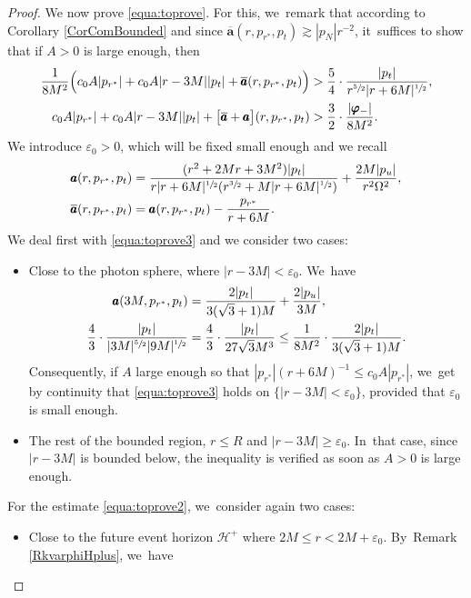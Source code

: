 \documentclass[10pt]{amsart}
\let\epsilon\varepsilon
\theoremstyle{plain}
\theoremstyle{definition}
\begin{document}
\begin{proof}
We now prove \eqref{equa:toprove}. For this, we~remark that according to Corollary \ref{CorComBounded} and since $\overline{\pmb{a}}(r,p_{r^*},p_t) \gtrsim |p_N|r^{-2}$, it~suffices to show that if $A>0$ is large enough, then
\begin{align}
\label{equa:toprove3}
\frac{1}{8M^2}\Bigl(c_0A |p_{r^*}|+c_0A|r-3M||p_t|+\overline{\pmb{a}}(r,p_{r^*},p_t) \Bigr) & > \frac{5}{4} \cdot \frac{|p_t|}{r^{\sfrac{5}{2}}|r+6M|^{\sfrac{1}{2}}}, \\
\label{equa:toprove2}
c_0A |p_{r^*}|+c_0A|r-3M||p_t|+ \bigl[\overline{\pmb{a}}+\pmb{a} \bigr](r,p_{r^*},p_t) & > \frac{3}{2} \cdot \frac{|\pmb{\varphi}_-|}{8M^2}.
\end{align}
We introduce $\epsilon_0>0$, which will be fixed small enough and we recall
\begin{align*}
\pmb{a}(r,p_{r^*},p_t) & = \frac{(r^2+2Mr+3M^2)|p_t|}{r|r+6M|^{\sfrac{1}{2}}(r^{\sfrac{3}{2}}+M|r+6M|^{\sfrac{1}{2}}) } +\frac{2M|p_u|}{r^2\Omega^2}, \\
\overline{\pmb{a}}(r,p_{r^*},p_t)& =\pmb{a}(r,p_{r^*},p_t)-\frac{p_{r^*}}{r+6M}.
\end{align*}
We deal first with \eqref{equa:toprove3} and we consider two cases:
\begin{itemize}
\item Close to the photon sphere, where $|r-3M| < \epsilon_0$. We~have
\begin{align*}
\pmb{a}(3M,p_{r^*},p_t) & = \frac{2|p_t|}{3(\sqrt{3}+1)M}+\frac{2|p_u|}{3M }, \\
\frac{4}{3} \cdot \frac{|p_t|}{|3M|^{\sfrac{5}{2}}|9M|^{\sfrac{1}{2}}} & = \frac{4}{3} \cdot \frac{|p_t|}{27 \sqrt{3} M^3} \leq \frac{1}{ 8M^2} \cdot \frac{2|p_t|}{3(\sqrt{3}+1)M}.
\end{align*}
Consequently, if $A$ large enough so that $|p_{r^*}|(r+6M)^{-1} \leq c_0A|p_{r^*}|$, we~get by continuity that \eqref{equa:toprove3} holds on $\{|r-3M|<\epsilon_0\}$, provided that $\epsilon_0$ is small enough.
\item The rest of the bounded region, $r \leq R$ and $|r-3M| \geq \epsilon_0$. In~that case, since $|r-3M|$ is bounded below, the inequality is verified as soon as $A>0$ is large enough.
\end{itemize}
For the estimate \eqref{equa:toprove2}, we~consider again two cases:
\begin{itemize}
\item Close to the future event horizon $\mathcal{H}^+$ where $2M \leq r < 2M+\epsilon_0$. By~Remark \ref{RkvarphiHplus}, we~have

\end{itemize}
\end{proof}
\end{document}
